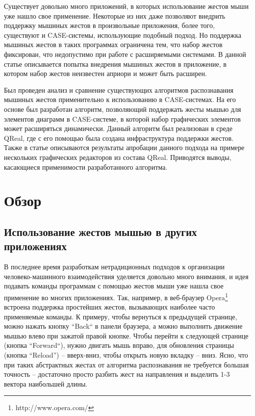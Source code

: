 \documentclass[a5paper]{article}
\begin{document}
Существует довольно много приложений, в которых использование жестов мыши уже нашло свое применение. Некоторые из них даже позволяют внедрить поддержку
мышиных жестов в произвольные приложения, более того, существуют и CASE-системы, использующие подобный подход. Но поддержка мышиных жестов в таких программах ограничена
тем, что набор жестов фиксирован, что недопустимо при работе с расширяемыми системами. В данной статье описывается попытка внедрения мышиных жестов в приложение, в котором 
набор жестов неизвестен априори и может быть расширен.

Был проведен анализ и сравнение существующих алгоритмов распознавания мышиных жестов применительно к использованию в CASE-системах. На его основе был разработан алгоритм, позволяющий поддержать жесты мышью для элементов диаграмм в CASE-системе, в которой набор графических элементов может расширяться динамически. Данный алгоритм был реализован в среде QReal, где с его помощью была создана инфраструктура поддержки жестов. Также в статье описываются результаты апробации данного подхода на примере нескольких графических редакторов из состава QReal. Приводятся выводы, касающиеся применимости разработанного алгоритма.

\section{Обзор}

\subsection{Использование жестов мышью в других приложениях}

В последнее время разработкам нетрадиционных подходов к организации человеко-машинного взаимодействия уделяется довольно много 
внимания, и идея подавать команды программам с помощью жестов мыши уже нашла свое применение во многих приложениях. Так, например, 
в веб-браузер Opera\footnote{http://www.opera.com/} встроена поддержка простейших жестов, вызывающих наиболее часто применяемые команды. К примеру, чтобы вернуться 
к предыдущей странице, можно нажать кнопку ``Back`` в панели браузера, а можно выполнить движение мышью влево при зажатой правой кнопке. 
Чтобы перейти к следующей странице (кнопка ``Forward``), нужно двигать мышь вправо, для обновления страницы (кнопка ``Reload'') -- вверх-вниз,
чтобы открыть новую вкладку -- вниз. Ясно, что при таких абстрактных жестах от алгоритма распознавания не требуется
большая точность -- достаточно просто разбить жест на направления и выделить 1-3 вектора наибольшей длины.
\end{document}
